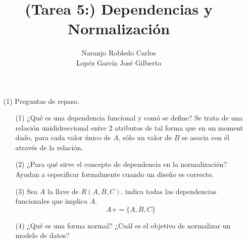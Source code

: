 \documentclass{article}
\title{(Tarea 5:) Dependencias y Normalización}
\author{Naranjo Robledo Carlos \\ Lopéz García José Gilberto}
\begin{document}
\begin{enumerate}
  \item[(1)] Preguntas de repaso.
  \begin{enumerate}
    \item[(1)] ¿Qué es una dependencia funcional y comó se define?
    Se trata de una relación unididreccional entre 2 atributos de tal forma que
    en un moment dado, para cada valor único de $A$, sólo un valor de $B$ se
    asocia con él através de la relación.
    \item[(2)] ¿Para qué sirve el concepto de dependencia en la normalización?
    Ayudan a especificar formalmente cuando un diseño es correcto.
    \item[(3)] Sea $A$ la llave de $R(A,B,C)$. indica todas las dependencias
    funcionales que implica $A$.
    $$ A += \{A,B,C\} $$
    \item[(4)] ¿Qué es una forma normal? ¿Cuál es el objetivo de normalizar un
    modelo de datos?


\end{enumerate}
\end{enumerate}
\end{document}
